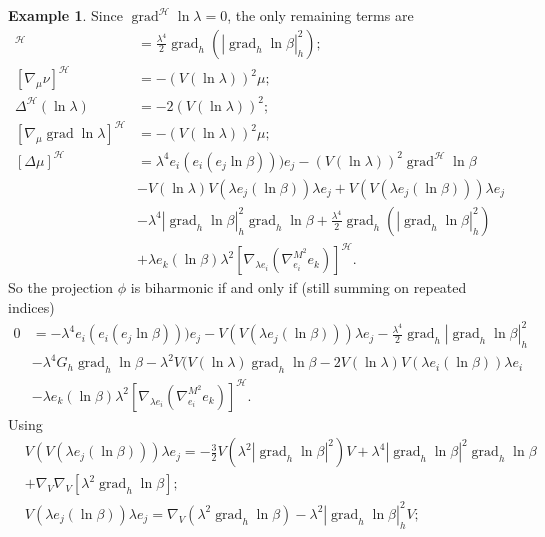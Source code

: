 \documentclass[12pt]{amsart}
\theoremstyle{plain}
\theoremstyle{definition}
\newtheorem{ex}{Example}
\begin{document}
\begin{ex}
Since $\operatorname{grad}^{\mathcal{H}} \ln\lambda =0$, the only remaining terms are
 \begin{align*}
[\nabla_{\mu}\mu]^{\mathcal{H}} &=  \tfrac{\lambda^4 }{2} \operatorname{grad}_{h} ( | \operatorname{grad}_{h} \ln\beta |_{h}^{2}) ;\\
[\nabla_{\mu} \nu]^{\mathcal{H}} &= - (V(\ln\lambda))^2 \mu ; \\
  \Delta^{\mathcal{H}} (\ln\lambda) &= -2(V(\ln\lambda))^2 ;\\
[\nabla_{\mu} \operatorname{grad}\ln\lambda]^{\mathcal{H}} & = - (V(\ln\lambda))^2 \mu ;\\
 [\Delta \mu ]^{\mathcal{H}} &= \lambda^4 e_{i}(e_{i}(e_{j}\ln\beta))) e_{j} - (V(\ln\lambda))^2 \operatorname{grad}^{\mathcal{H}} \ln\beta\\
&- V(\ln\lambda) V(\lambda e_{j}(\ln\beta)) \lambda e_{j} +  V(V(\lambda e_{j}(\ln\beta))) \lambda e_{j}\\
& - \lambda^4 |\operatorname{grad}_{h} \ln\beta|_{h}^{2} \operatorname{grad}_{h} \ln\beta 
+ \tfrac{\lambda^4}{2} \operatorname{grad}_{h}(|\operatorname{grad}_{h} \ln\beta|_{h}^{2}) \\
&+ \lambda e_{k}(\ln\beta)\lambda^2 [\nabla_{\lambda e_i}(\nabla^{M^2}_{e_i}e_k)]^{\mathcal{H}} .
\end{align*}
So the projection $\phi$ is biharmonic if and only if (still summing on repeated
indices)
\begin{align*}
0 &= -\lambda^4 e_{i}(e_{i}(e_{j}\ln\beta))) e_{j} - V(V(\lambda e_{j}(\ln\beta)))
\lambda e_{j} - \tfrac{\lambda^{4}}{2} \operatorname{grad}_{h} |\operatorname{grad}_{h} \ln\beta|_{h}^{2}\\
& - \lambda^4 G_{h} \operatorname{grad}_{h} \ln\beta  
- \lambda^2 V(V(\ln\lambda)\operatorname{grad}_h \ln\beta  - 2V(\ln\lambda)V(\lambda e_{i}(\ln\beta))
\lambda e_{i} \\
&- \lambda e_{k}(\ln\beta)\lambda^2 [\nabla_{\lambda
e_i}(\nabla^{M^2}_{e_i}e_k)]^{\mathcal{H}} .
\end{align*}
Using
\begin{align*}
&V(V(\lambda e_{j}(\ln\beta))) \lambda e_{j}  = - \tfrac{3}{2} V(\lambda^2
|\operatorname{grad}_{h}\ln \beta|^2) V + \lambda^4|\operatorname{grad}_{h}\ln \beta|^2 \operatorname{grad}_{h}\ln \beta \\
& + \nabla_{V}\nabla_{V} [\lambda^2 \operatorname{grad}_{h}\ln \beta] ;\\
&V(\lambda e_{j}(\ln\beta)) \lambda e_{j} = \nabla_{V} (\lambda^2 \operatorname{grad}_{h}\ln \beta) - \lambda^2 |\operatorname{grad}_h \ln\beta |_{h}^2 V ;\\

\end{align*}
\end{ex}
\end{document}
